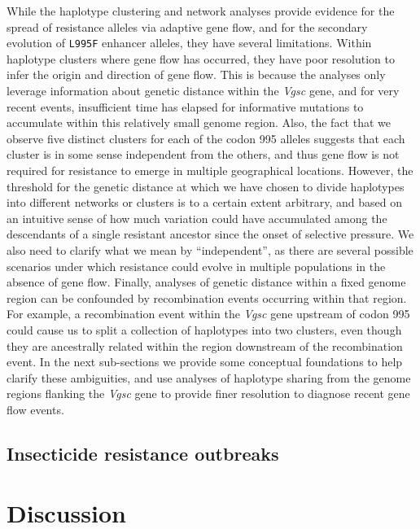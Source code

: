 \documentclass[a4paper,11pt,abstracton]{scrartcl}
\begin{document}
%
While the haplotype clustering and network analyses provide evidence for the spread of resistance alleles via adaptive gene flow, and for the secondary evolution of \texttt{L995F} enhancer alleles, they have several limitations.
%
Within haplotype clusters where gene flow has occurred, they have poor resolution to infer the origin and direction of gene flow.
%
This is because the analyses only leverage information about genetic distance within the \textit{Vgsc} gene, and for very recent events, insufficient time has elapsed for informative mutations to accumulate within this relatively small genome region.
%
Also, the fact that we observe five distinct clusters for each of the codon 995 alleles suggests that each cluster is in some sense independent from the others, and thus gene flow is not required for resistance to emerge in multiple geographical locations.
%
However, the threshold for the genetic distance at which we have chosen to divide haplotypes into different networks or clusters is to a certain extent arbitrary, and based on an intuitive sense of how much variation could have accumulated among the descendants of a single resistant ancestor since the onset of selective pressure.
%
We also need to clarify what we mean by ``independent'', as there are several possible scenarios under which resistance could evolve in multiple populations in the absence of gene flow.
%
Finally, analyses of genetic distance within a fixed genome region can be confounded by recombination events occurring within that region.
%
For example, a recombination event within the \textit{Vgsc} gene upstream of codon 995 could cause us to split a collection of haplotypes into two clusters, even though they are ancestrally related within the region downstream of the recombination event.
%
In the next sub-sections we provide some conceptual foundations to help clarify these ambiguities, and use analyses of haplotype sharing from the genome regions flanking the \textit{Vgsc} gene to provide finer resolution to diagnose recent gene flow events.


\subsection*{Insecticide resistance outbreaks}




\section*{Discussion}
\end{document}

